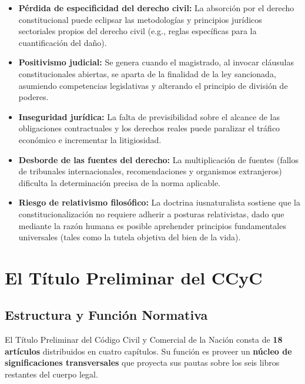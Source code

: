 \documentclass[12pt,oneside]{book}
\begin{document}
\begin{itemize}
    \item \textbf{Pérdida de especificidad del derecho civil:} La absorción por el derecho constitucional puede eclipsar las metodologías y principios jurídicos sectoriales propios del derecho civil (e.g., reglas específicas para la cuantificación del daño).
    \item \textbf{Positivismo judicial:} Se genera cuando el magistrado, al invocar cláusulas constitucionales abiertas, se aparta de la finalidad de la ley sancionada, asumiendo competencias legislativas y alterando el principio de división de poderes.
    \item \textbf{Inseguridad jurídica:} La falta de previsibilidad sobre el alcance de las obligaciones contractuales y los derechos reales puede paralizar el tráfico económico e incrementar la litigiosidad.
    \item \textbf{Desborde de las fuentes del derecho:} La multiplicación de fuentes (fallos de tribunales internacionales, recomendaciones y organismos extranjeros) dificulta la determinación precisa de la norma aplicable.
    \item \textbf{Riesgo de relativismo filosófico:} La doctrina iusnaturalista sostiene que la constitucionalización no requiere adherir a posturas relativistas, dado que mediante la razón humana es posible aprehender principios fundamentales universales (tales como la tutela objetiva del bien de la vida).
\end{itemize}


\chapter{El Título Preliminar del CCyC}

\section{Estructura y Función Normativa}

El Título Preliminar del Código Civil y Comercial de la Nación consta de \textbf{18 artículos} distribuidos en cuatro capítulos. Su función es proveer un \textbf{núcleo de significaciones transversales} que proyecta sus pautas sobre los seis libros restantes del cuerpo legal.
\end{document}
